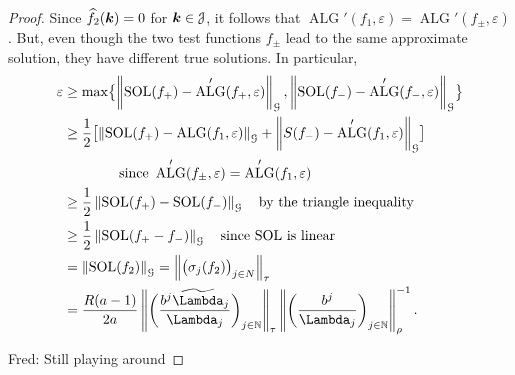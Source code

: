 \documentclass[USenglish]{article}
\theoremstyle{dgthm}
\theoremstyle{dgthm}
\theoremstyle{dgthm}
\theoremstyle{dgthm}
\theoremstyle{dgdef}
\theoremstyle{definition}
\DeclareMathOperator{\SOL}{SOL}
\DeclareMathOperator{\ALG}{ALG}
\newcommand{\hf}{\widehat{f}}
\newcommand{\norm}[2][{}]{\ensuremath{\left \lVert #2 \right \rVert}_{#1}}
\newcommand{\FredNote}[1]{{\color{blue}Fred: #1}}
\newcommand{\tLambda}{\widetilde{\Lambda}}
\begin{document}
\begin{proof}
Since $\hf_2(\bsk) = 0$ for ${\boldsymbol{k}} \in {\mathcal{J}}$, it follows that $\ALG'(f_1,\varepsilon) = \ALG'(f_\pm,\varepsilon)$.  But, even though the two test functions $f_\pm$ lead to the same approximate solution, they have different true solutions.  In particular,
\begin{align*}
\varepsilon &\ge \max \bigl\{\norm[\calG]{\SOL(f_+) - \ALG'(f_+,\varepsilon)}, \norm[\calG]{\SOL(f_-) - \ALG'(f_-,\varepsilon)} \bigr\} \\
&\ge \frac 12 \bigl[\norm[\calG]{\SOL(f_+) - \ALG(f_1,\varepsilon)} + \norm[\calG]{S(f_-) - \ALG'(f_1,\varepsilon)}  \bigr] \\
&\qquad \qquad \text{since } \ALG'(f_\pm,\varepsilon) = \ALG'(f_1,\varepsilon) \\
&\ge \frac 12 \norm[\calG]{\SOL(f_+) - \SOL(f_-)} \quad \text{by the triangle inequality}\\
&\ge \frac 12 \norm[\calG]{\SOL(f_+ - f_-)} \quad \text{since $\SOL$ is linear}\\
&= \norm[\calG]{\SOL(f_2)} = \norm[\tau]{\bigl( \sigma_j(f_2) \bigr)_{j \in N}} \\
& = 
\frac{R(a-1)}{2a} \norm[\tau]{ \biggl(\frac{b^{j}\tLambda_j}{\Lambda_j} \biggr)_{j \in \N}} \norm[\rho]{ \biggl(\frac{b^{j}}{\Lambda_j} \biggr)_{j \in \N}}^{-1}.
\end{align*}


\FredNote{Still playing around}


\end{proof}
\end{document}
